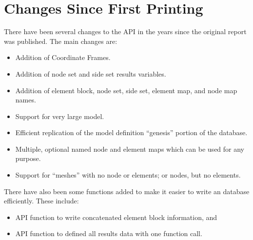 \chapter{Changes Since First Printing}
There have been several changes to the \exo{} API in the years since
the original \exo{} report was published.  The main changes are:
\begin{itemize}
\item Addition of Coordinate Frames.
\item Addition of node set and side set results variables.
\item Addition of element block, node set, side set, element map, and
node map names.
\item Support for very large model.
\item Efficient replication of the model definition ``genesis''
portion of the database.
\item Multiple, optional named node and element maps which can be used
for any purpose.
\item Support for ``meshes'' with no node or elements; or nodes, but
no elements.
\end{itemize}

There have also been some functions added to make it easier to write
an \exo{} database efficiently.  These include:
\begin{itemize}
\item API function to write concatenated element block information,
and
\item API function to defined all results data with one function call.
\end{itemize}
